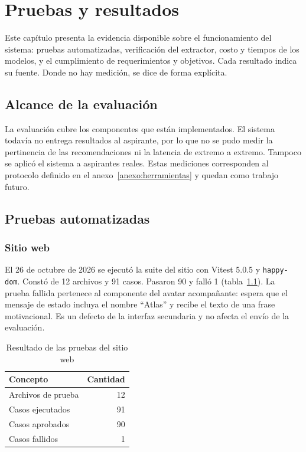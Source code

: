 ﻿\chapter{Pruebas y resultados}
Este capítulo presenta la evidencia disponible sobre el funcionamiento del sistema: pruebas automatizadas, verificación del extractor, costo y tiempos de los modelos, y el cumplimiento de requerimientos y objetivos. Cada resultado indica su fuente. Donde no hay medición, se dice de forma explícita.

\section{Alcance de la evaluación}
La evaluación cubre los componentes que están implementados. El sistema todavía no entrega resultados al aspirante, por lo que no se pudo medir la pertinencia de las recomendaciones ni la latencia de extremo a extremo. Tampoco se aplicó el sistema a aspirantes reales. Estas mediciones corresponden al protocolo definido en el anexo~\ref{anexo:herramientas} y quedan como trabajo futuro.

\section{Pruebas automatizadas}
\subsection{Sitio web}
El 26 de octubre de 2026 se ejecutó la suite del sitio con Vitest 5.0.5 y \texttt{happy-dom}. Constó de 12 archivos y 91 casos. Pasaron 90 y falló 1 (tabla~\ref{tab:pruebas-web}). La prueba fallida pertenece al componente del avatar acompañante: espera que el mensaje de estado incluya el nombre ``Atlas'' y recibe el texto de una frase motivacional. Es un defecto de la interfaz secundaria y no afecta el envío de la evaluación.

\begin{table}[H]
\centering
\small
\renewcommand{\arraystretch}{1.2}
\caption{Resultado de las pruebas del sitio web}
\label{tab:pruebas-web}
\begin{tabular}{lr}
\toprule
\rowcolor{encabezadoTabla} \color{white}\textbf{Concepto} & \color{white}\textbf{Cantidad} \\
\midrule
Archivos de prueba & 12 \\
\rowcolor{filaAlterna}
Casos ejecutados & 91 \\
Casos aprobados & 90 \\
\rowcolor{filaAlterna}
Casos fallidos & 1 \\
\bottomrule
\end{tabular}
\end{table}

